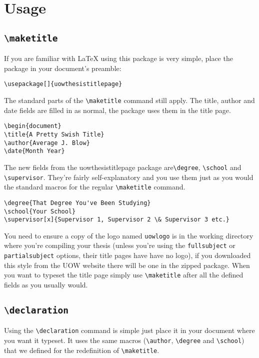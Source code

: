 \documentclass[12pt,oneside]{article}
\newcommand{\oporcom}[1]{\texttt{\color{Red}#1}} %
\begin{document}
\section{Usage}
\subsection*{\oporcom{\textbackslash{}maketitle}}
If you are familiar with LaTeX using this package is very simple, place the package in your document's preamble:
\begin{verbatim}
\usepackage[]{uowthesistitlepage} 
\end{verbatim}
The standard parts of the \oporcom{\textbackslash{}maketitle} command still apply. The title, author and date fields are filled in as normal, the package uses them in the title page.
\begin{verbatim}
\begin{document}
\title{A Pretty Swish Title} 
\author{Average J. Blow}
\date{Month Year}
\end{verbatim}
The new fields from the uowthesistitlepage package are\oporcom{\textbackslash{}degree}, \oporcom{\textbackslash{}school} and \oporcom{\textbackslash{}supervisor}. They're fairly self-explanatory and you use them just as you would the standard macros for the regular \oporcom{\textbackslash{}maketitle} command.  
\begin{verbatim}
\degree{That Degree You've Been Studying} 
\school{Your School} 
\supervisor[x]{Supervisor 1, Supervisor 2 \& Supervisor 3 etc.}
\end{verbatim}
You need to ensure a copy of the logo named \texttt{uow\textunderscore{}logo} is in the working directory where you're compiling your thesis (unless you're using the \oporcom{fullsubject} or \oporcom{partialsubject} options, their title pages have have no logo), if you downloaded this style from the UOW website there will be one in the zipped package. When you want to typeset the title page simply use \oporcom{\textbackslash{}maketitle} after all the defined fields as you usually would.

\subsection*{\oporcom{\textbackslash{}declaration}}
Using the \oporcom{\textbackslash{}declaration} command is simple just place it in your document where you want it typeset. It uses the same macros (\oporcom{\textbackslash{}author}, \oporcom{\textbackslash{}degree} and \oporcom{\textbackslash{}school}) that we defined for the redefinition of \oporcom{\textbackslash{}maketitle}. 
\end{document}
